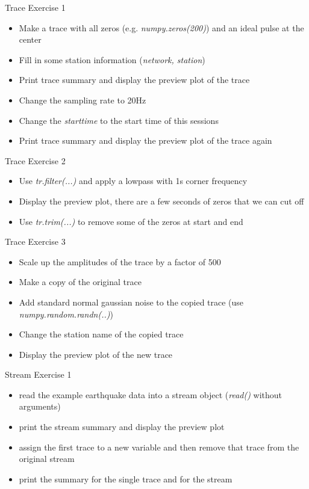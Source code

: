 \begin{frame}{Trace Exercise 1}
    \begin{itemize}
        \item Make a trace with all zeros (e.g. \textit{numpy.zeros(200)}) and an ideal pulse at the center
        \item Fill in some station information (\textit{network, station})
        \item Print trace summary and display the preview plot of the trace
        \item Change the sampling rate to 20Hz
        \item Change the \textit{starttime} to the start time of this sessions
        \item Print trace summary and display the preview plot of the trace again
    \end{itemize}
\end{frame}

\begin{frame}{Trace Exercise 2}
    \begin{itemize}
        \item Use \textit{tr.filter(...)} and apply a lowpass with 1s corner frequency
        \item Display the preview plot, there are a few seconds of zeros that we can cut off
        \item Use \textit{tr.trim(...)} to remove some of the zeros at start and end
    \end{itemize}
\end{frame}


\begin{frame}{Trace Exercise 3}
    \begin{itemize}
        \item Scale up the amplitudes of the trace by a factor of 500
        \item Make a copy of the original trace
        \item Add standard normal gaussian noise to the copied trace (use \textit{numpy.random.randn(..)})
        \item Change the station name of the copied trace
        \item Display the preview plot of the new trace
    \end{itemize}
\end{frame}


\begin{frame}{Stream Exercise 1}
    \begin{itemize}
        \item read the example earthquake data into a stream object (\textit{read()} without arguments)
        \item print the stream summary and display the preview plot
        \item assign the first trace to a new variable and then remove that trace from the original stream
        \item print the summary for the single trace and for the stream
    \end{itemize}
\end{frame}

